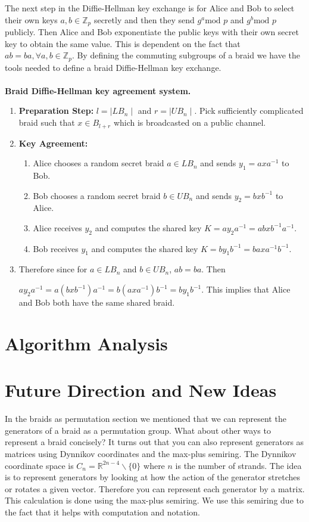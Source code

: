 \documentclass{article}
\theoremstyle{definition}
\begin{document}
The next step in the Diffie-Hellman key exchange is for Alice and Bob to select their own keys $a,b \in \mathbb{Z}_p$  secretly and then they send $g^a \text{mod }p$ and $g^b \text{mod }p$ publicly. Then Alice and Bob exponentiate the public keys with their own secret key to obtain the same value. This is dependent on the fact that $ab=ba,  \forall a,b \in \mathbb{Z}_p$. By defining the commuting subgroups of a braid we have the tools needed to define a braid Diffie-Hellman key exchange. 
\\ \\
\textbf{Braid Diffie-Hellman key agreement system.}
\begin{enumerate}

\item \textbf{Preparation Step:} $l=\mid LB_n \mid$ and $r=\mid UB_n \mid$. Pick sufficiently complicated braid such that $x \in B_{l+r}$ which is broadcasted on a public channel. 

\item \textbf{Key Agreement:} 
	 \begin{enumerate}
	 	\item Alice chooses a random secret braid $a \in LB_n$ and sends $y_1=axa^{-1}$ to Bob.
		\item Bob chooses a random secret braid $b \in UB_n$ and sends $y_2=bxb^{-1}$ to Alice.
		\item Alice receives $y_2$ and computes the shared key $K=ay_2a^{-1}=abxb^{-1}a^{-1}$.
		\item Bob receives $y_1$ and computes the shared key $K=by_1b^{-1}=baxa^{-1}b^{-1}$.
	 \end{enumerate}
\item Therefore since for $a \in LB_n$ and $b \in UB_n$, $ab=ba$. Then
\begin{centering}
$ay_2a^{-1}=a(bxb^{-1})a^{-1}=b(axa^{-1})b^{-1}=by_1b^{-1}$. This implies that Alice and Bob both have the same shared braid.
\end{centering}
\end{enumerate}

\section{Algorithm Analysis}


\section{Future Direction and New Ideas}
In the braids as permutation section we mentioned that we can represent the generators of a braid as a permutation group. What about other ways to represent a braid concisely? It turns out that you can also represent generators as matrices using Dynnikov coordinates and the max-plus semiring. The Dynnikov coordinate space is $C_n=\mathbb{R}^{2n-4} \backslash \{0\}$ where $n$ is the number of strands. The idea is to represent generators by looking at how the action of the generator stretches or rotates a given vector. Therefore you can represent each generator by a matrix. This calculation is done using the max-plus semiring. We use this semiring due to the fact that it helps with computation and notation. 
\end{document}
